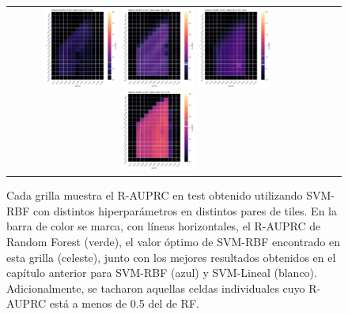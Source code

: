\begin{figure}[h!]
\begin{tabular}{cccc}
     \includegraphics[width=0.25\textwidth]{Kap8/heatmap_train=b234_test=b360.png}  
  \includegraphics[width=0.25\textwidth]{Kap8/heatmap_train=b261_test=b360.png}
  \includegraphics[width=0.25\textwidth]{Kap8/heatmap_train=b278_test=b360.png} 
   \includegraphics[width=0.25\textwidth]{Kap8/heatmap_train=b360_test=b278.png} \\

\end{tabular}
\caption{Cada grilla muestra el R-AUPRC en test obtenido utilizando SVM-RBF con distintos hiperparámetros en distintos pares de tiles. En la barra de color se marca, con líneas horizontales, el R-AUPRC de Random Forest (verde), el valor óptimo de SVM-RBF encontrado en esta grilla (celeste), junto con los mejores resultados obtenidos en el capítulo anterior para SVM-RBF (azul) y SVM-Lineal (blanco). Adicionalmente, se tacharon aquellas celdas individuales cuyo R-AUPRC está a menos de 0.5 del de RF. }
\label{fig:poder_predictivo}
\end{figure}

